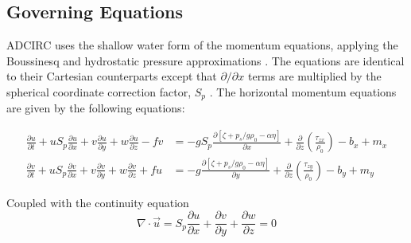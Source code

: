 \documentclass[a4paper, 11pt]{article}
\begin{document}
\subsection{Governing Equations}
ADCIRC uses the shallow water form of the momentum equations, applying the Boussinesq and hydrostatic pressure approximations \cite{bib:num}. 
The equations are identical to their Cartesian counterparts except that $\partial/\partial x$ terms are multiplied by the spherical coordinate correction factor, $S_p$ \cite{bib:num}. The horizontal momentum equations are given by the following equations:

\begin{align}
\label{eqn:sph}
	\frac{\partial u}{\partial t} + u S_p \frac{\partial u}{\partial x} + v \frac{\partial u}{\partial y} + w \frac{\partial u}{\partial z} - fv &= -g S_p \frac{\partial \left[\zeta + p_s/g \rho_0 - \alpha \eta\right]}{\partial x} + \frac{\partial}{\partial z} \left(\frac{\tau_{zx}}{\rho_0}\right) - b_x + m_x \\
	\frac{\partial v}{\partial t} + u S_p \frac{\partial v}{\partial x} + v \frac{\partial v}{\partial y} + w \frac{\partial v}{\partial z} + fu &= -g \frac{\partial \left[\zeta + p_s/g \rho_0 - \alpha \eta\right]}{\partial y} + \frac{\partial}{\partial z} \left(\frac{\tau_{zy}}{\rho_0}\right) - b_y + m_y
\end{align}

Coupled with the continuity equation
\begin{equation*}
\nabla \cdot \vec{u} = S_p \frac{\partial u}{\partial x} + \frac{\partial v}{\partial y} + \frac{\partial w}{\partial z} = 0
\end{equation*}
\end{document}
